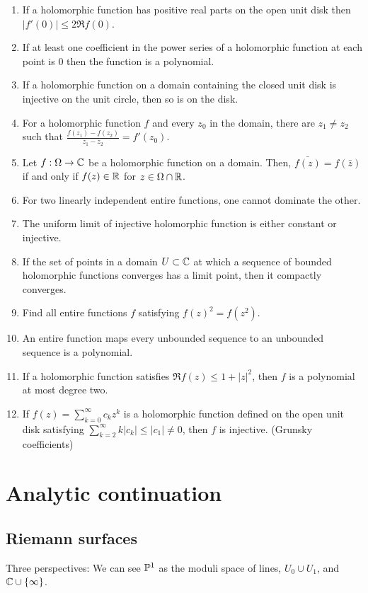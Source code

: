 \documentclass{../../large}
\begin{document}
\begin{enumerate}
\item If a holomorphic function has positive real parts on the open unit disk then $|f'(0)|\le2\Re f(0)$.
\item If at least one coefficient in the power series of a holomorphic function at each point is 0 then the function is a polynomial.
\item If a holomorphic function on a domain containing the closed unit disk is injective on the unit circle, then so is on the disk.
\item For a holomorphic function $f$ and every $z_0$ in the domain, there are $z_1\ne z_2$ such that $\frac{f(z_1)-f(z_2)}{z_1-z_2}=f'(z_0)$.
\item Let $f:\Omega\to\C$ be a holomorphic function on a domain. Then, $\bar{f(z)}=f(\bar z)$ if and only if $f(z)\in\R$ for $z\in\Omega\cap\R$.
\item For two linearly independent entire functions, one cannot dominate the other.
\item The uniform limit of injective holomorphic function is either constant or injective.
\item If the set of points in a domain $U\subset\C$ at which a sequence of bounded holomorphic functions converges has a limit point, then it compactly converges.
\item Find all entire functions $f$ satisfying $f(z)^2=f(z^2)$.
\item An entire function maps every unbounded sequence to an unbounded sequence is a polynomial.
\item If a holomorphic function satisfies $\Re f(z)\le1+|z|^2$, then $f$ is a polynomial at most degree two.
\item If $f(z)=\sum_{k=0}^\infty c_kz^k$ is a holomorphic function defined on the open unit disk satisfying $\sum_{k=2}^\infty k|c_k|\le|c_1|\ne0$, then $f$ is injective. (Grunsky coefficients)
\end{enumerate}



\chapter{Analytic continuation}

\section{Riemann surfaces}
Three perspectives:
We can see $\P^1$ as the moduli space of lines, $U_0\cup U_1$, and $\C\cup\{\infty\}$.
\end{document}
